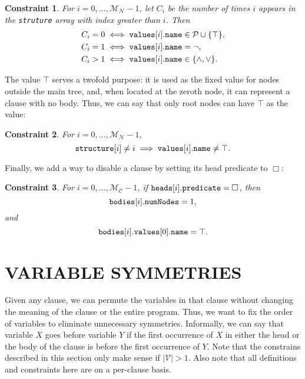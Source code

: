 \documentclass[letterpaper]{article}
\newtheorem{constraint}{Constraint}
\theoremstyle{definition}
\newcommand{\variable}[1]{\texttt{\textup{#1}}}
\newcommand{\predicates}{\mathcal{P}}
\newcommand{\variables}{\mathcal{V}}
\newcommand{\maxNumNodes}{\mathcal{M}_{\mathcal{N}}}
\newcommand{\maxNumClauses}{\mathcal{M}_{\mathcal{C}}}
\begin{document}
\begin{constraint} \label{constraint:node_types}
  For $i = 0, \dots, \maxNumNodes{} - 1$, let $C_i$ be the number of times $i$
  appears in the \variable{struture} array with index greater than $i$. Then
  \begin{align*}
    C_i = 0 &\iff \variable{values}[i].\variable{name} \in \predicates{} \cup \{ \top \},\\
    C_i = 1 &\iff \variable{values}[i].\variable{name} = \neg,\\
    C_i > 1 &\iff \variable{values}[i].\variable{name} \in \{ \land, \lor \}.
  \end{align*}
\end{constraint}

The value $\top$ serves a twofold purpose: it is used as the fixed value for
nodes outside the main tree, and, when located at the zeroth node, it can
represent a clause with no body. Thus, we can say that only root nodes can have
$\top$ as the value:

\begin{constraint}
  For $i = 0, \dots, \maxNumNodes{} - 1$,
  \[
    \variable{structure}[i] \ne i \implies
    \variable{values}[i].\variable{name} \ne \top.
  \]
\end{constraint}

Finally, we add a way to disable a clause by setting its head predicate to
$\Box$:

\begin{constraint}
  For $i = 0, \dots, \maxNumClauses{} - 1$, if
  $\variable{heads}[i].\variable{predicate} = \Box$, then
  \[
    \variable{bodies}[i].\variable{numNodes} = 1,
  \]
  and
  \[
    \variable{bodies}[i].\variable{values}[0].\variable{name} =
    \top.
  \]
\end{constraint}

\section{VARIABLE SYMMETRIES} \label{sec:variable_symmetry}

Given any clause, we can permute the variables in that clause without changing
the meaning of the clause or the entire program. Thus, we want to fix the order
of variables to eliminate unnecessary symmetries. Informally, we can say that
variable $X$ goes before variable $Y$ if the first occurrence of $X$ in either
the head or the body of the clause is before the first occurrence of $Y$. Note
that the constrains described in this section only make sense if $|\variables| >
1$. Also note that all definitions and constraints here are on a per-clause
basis.
\end{document}

